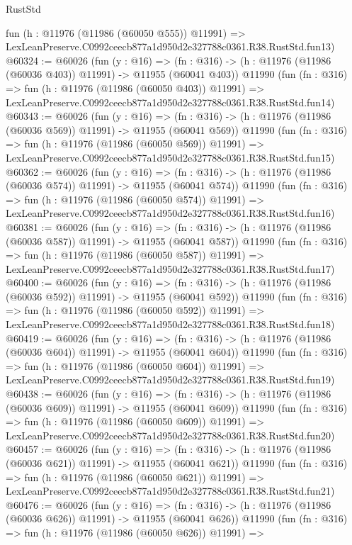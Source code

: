 \begin{lexlean}{RustStd}
\begin{coremodule}
    fun (h : @11976 (@11986 (@60050 @555)) @11991) =>
    LexLeanPreserve.C0992ceecb877a1d950d2e327788c0361.R38.RustStd.fun13)
@60324 := @60026
    (fun (y : @16) =>
    (fn : @316) -> (h : @11976 (@11986 (@60036 @403)) @11991) -> @11955 (@60041 @403))
    @11990
    (fun (fn : @316) =>
    fun (h : @11976 (@11986 (@60050 @403)) @11991) =>
    LexLeanPreserve.C0992ceecb877a1d950d2e327788c0361.R38.RustStd.fun14)
@60343 := @60026
    (fun (y : @16) =>
    (fn : @316) -> (h : @11976 (@11986 (@60036 @569)) @11991) -> @11955 (@60041 @569))
    @11990
    (fun (fn : @316) =>
    fun (h : @11976 (@11986 (@60050 @569)) @11991) =>
    LexLeanPreserve.C0992ceecb877a1d950d2e327788c0361.R38.RustStd.fun15)
@60362 := @60026
    (fun (y : @16) =>
    (fn : @316) -> (h : @11976 (@11986 (@60036 @574)) @11991) -> @11955 (@60041 @574))
    @11990
    (fun (fn : @316) =>
    fun (h : @11976 (@11986 (@60050 @574)) @11991) =>
    LexLeanPreserve.C0992ceecb877a1d950d2e327788c0361.R38.RustStd.fun16)
@60381 := @60026
    (fun (y : @16) =>
    (fn : @316) -> (h : @11976 (@11986 (@60036 @587)) @11991) -> @11955 (@60041 @587))
    @11990
    (fun (fn : @316) =>
    fun (h : @11976 (@11986 (@60050 @587)) @11991) =>
    LexLeanPreserve.C0992ceecb877a1d950d2e327788c0361.R38.RustStd.fun17)
@60400 := @60026
    (fun (y : @16) =>
    (fn : @316) -> (h : @11976 (@11986 (@60036 @592)) @11991) -> @11955 (@60041 @592))
    @11990
    (fun (fn : @316) =>
    fun (h : @11976 (@11986 (@60050 @592)) @11991) =>
    LexLeanPreserve.C0992ceecb877a1d950d2e327788c0361.R38.RustStd.fun18)
@60419 := @60026
    (fun (y : @16) =>
    (fn : @316) -> (h : @11976 (@11986 (@60036 @604)) @11991) -> @11955 (@60041 @604))
    @11990
    (fun (fn : @316) =>
    fun (h : @11976 (@11986 (@60050 @604)) @11991) =>
    LexLeanPreserve.C0992ceecb877a1d950d2e327788c0361.R38.RustStd.fun19)
@60438 := @60026
    (fun (y : @16) =>
    (fn : @316) -> (h : @11976 (@11986 (@60036 @609)) @11991) -> @11955 (@60041 @609))
    @11990
    (fun (fn : @316) =>
    fun (h : @11976 (@11986 (@60050 @609)) @11991) =>
    LexLeanPreserve.C0992ceecb877a1d950d2e327788c0361.R38.RustStd.fun20)
@60457 := @60026
    (fun (y : @16) =>
    (fn : @316) -> (h : @11976 (@11986 (@60036 @621)) @11991) -> @11955 (@60041 @621))
    @11990
    (fun (fn : @316) =>
    fun (h : @11976 (@11986 (@60050 @621)) @11991) =>
    LexLeanPreserve.C0992ceecb877a1d950d2e327788c0361.R38.RustStd.fun21)
@60476 := @60026
    (fun (y : @16) =>
    (fn : @316) -> (h : @11976 (@11986 (@60036 @626)) @11991) -> @11955 (@60041 @626))
    @11990
    (fun (fn : @316) =>
    fun (h : @11976 (@11986 (@60050 @626)) @11991) =>

\end{coremodule}
\end{lexlean}
